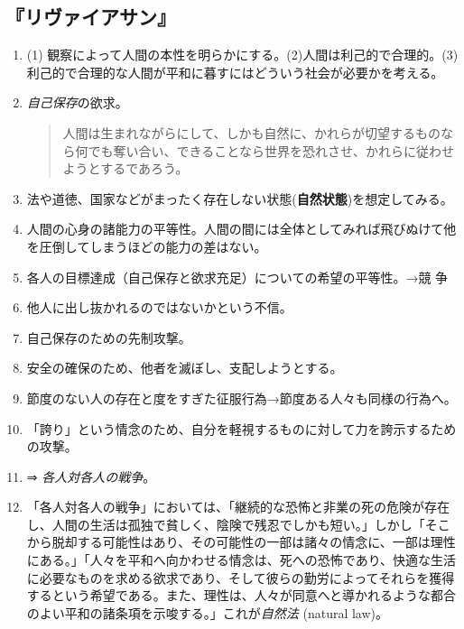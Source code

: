 \documentclass[uplatex,dvipdfmx]{jsarticle} \usepackage{mystyle}%
\begin{document}
\subsection{『リヴァイアサン』}



 \begin{enumerate}

 \item (1) 観察によって人間の本性を明らかにする。(2)人間は利己的で合理的。(3)利己的で合理的な人間が平和に暮すにはどういう社会が必要かを考える。

  \item \emph{自己保存}の欲求。

  \begin{quote}
    人間は生まれながらにして、しかも自然に、かれらが切望するものなら何でも奪い合い、できることなら世界を恐れさせ、かれらに従わせようとするであろう。
  \end{quote}

\item 法や道徳、国家などがまったく存在しない状態({\bf 自然状態})を想定してみる。

\item 人間の心身の諸能力の平等性。人間の間には全体としてみれば飛びぬけて他を圧倒してしまうほどの能力の差はない。

\item 各人の目標達成（自己保存と欲求充足）についての希望の平等性。→競
  争

\item 他人に出し抜かれるのではないかという不信。

\item 自己保存のための先制攻撃。
\item 安全の確保のため、他者を滅ぼし、支配しようとする。
\item 節度のない人の存在と度をすぎた征服行為→節度ある人々も同様の行為へ。
\item 「誇り」という情念のため、自分を軽視するものに対して力を誇示するための攻撃。

    \item ⇒ \emph{各人対各人の戦争}。


    \item 「各人対各人の戦争」においては、「継続的な恐怖と非業の死の危険が存在し、人間の生活は孤独で貧しく、陰険で残忍でしかも短い。」しかし「そこから脱却する可能性はあり、その可能性の一部は諸々の情念に、一部は理性にある。」「人々を平和へ向かわせる情念は、死への恐怖であり、快適な生活に必要なものを求める欲求であり、そして彼らの勤労によってそれらを獲得するという希望である。また、理性は、人々が同意へと導かれるような都合のよい平和の諸条項を示唆する。」これが\emph{自然法} (natural law)。


\end{enumerate}
\end{document}
